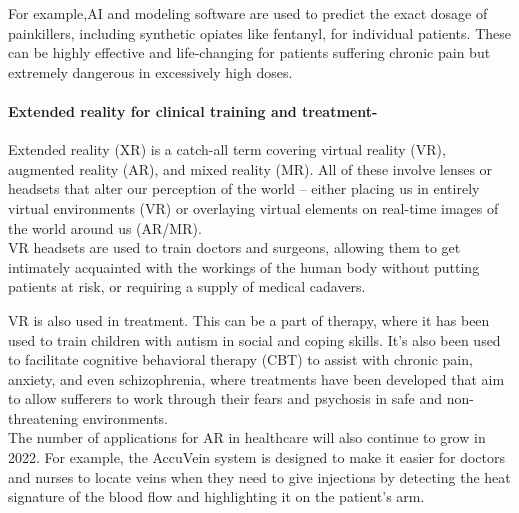 \documentclass[a4paper,12pt]{extarticle}
\begin{document}
For example,AI and modeling software are used to predict the exact dosage of painkillers, including synthetic opiates like fentanyl, for individual patients. These can be highly effective and life-changing for patients suffering chronic pain but extremely dangerous in excessively high doses.

  
\paragraph{Extended reality for clinical training and treatment-}Extended reality (XR) is a catch-all term covering virtual reality (VR), augmented reality (AR), and mixed reality (MR). All of these involve lenses or headsets that alter our perception of the world – either placing us in entirely virtual environments (VR) or overlaying virtual elements on real-time images of the world around us (AR/MR).\\

VR headsets are used to train doctors and surgeons, allowing them to get intimately acquainted with the workings of the human body without putting patients at risk, or requiring a supply of medical cadavers.

VR is also used in treatment. This can be a part of therapy, where it has been used to train children with autism in social and coping skills. It's also been used to facilitate cognitive behavioral therapy (CBT) to assist with chronic pain, anxiety, and even schizophrenia, where treatments have been developed that aim to allow sufferers to work through their fears and psychosis in safe and non-threatening environments.\\

The number of applications for AR in healthcare will also continue to grow in 2022. For example, the AccuVein system is designed to make it easier for doctors and nurses to locate veins when they need to give injections by detecting the heat signature of the blood flow and highlighting it on the patient’s arm.\\




  


 
 




   
\end{document}
